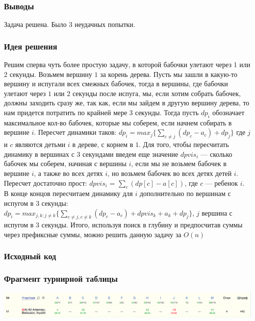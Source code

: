 \subsubsection*{Выводы}
Задача решена. Было 3 неудачных попытки.
\pagebreak


\subsubsection*{Идея решения}
Решим сперва чуть более простую задачу, в которой бабочки улетают через 1 или 2 секунды. Возьмем вершину $1$ за корень дерева.
Пусть мы зашли в какую-то вершину и испугали всех смежных бабочек, тогда в вершины, где бабочки улетают через $1$ или $2$ секунды после испуга, мы, если хотим собрать бабочек, должны заходить сразу же, так как, если мы зайдем в другую вершину дерева, то нам придется потратить по крайней мере $3$ секунды.
Тогда пусть $dp_i$ обозначает максимальное кол-во бабочек, которые мы соберем, если начнем собирать в вершине $i$. Пересчет динамики таков: $dp_i = max_{j}\{\sum_{c \neq j}(dp_c - a_c) + dp_j\}$ где $j$ и $c$ являются детьми $i$ в дереве, с корнем в $1$.
Для того, чтобы пересчитать динамику в вершинах с $3$ секундами введем еще значение $dpvis_i$ --- сколько бабочек мы соберем, начиная с вершины $i$, если мы не возьмем бабочек в вершине $i$, а также во всех детях $i$, но возьмем бабочек во всех детях детей $i$. Пересчет достаточно прост: $dpvis_i$ = $\sum_{c}(dp[c] - a[c])$, где $c$ --- ребенок $i$. В конце концов пересчитаем динамику для $i$ дополнительно по вершинам с испугом в $3$ секунды: $dp_i = max_{j, k : j \neq k}\{\sum_{c \neq j, c \neq k}(dp_c - a_c) + dpvis_k + a_k + dp_j\}$, $j$ вершина с испугом в 3 секунды. Итого, используя поиск в глубину и предпосчитав суммы через префиксные суммы, можно решить данную задачу за $O(n)$
\subsubsection*{Исходный код}

\subsubsection*{Фрагмент турнирной таблицы}
\includegraphics[width=\textwidth]{images/gp_nanjing.png}\newline\noindent
